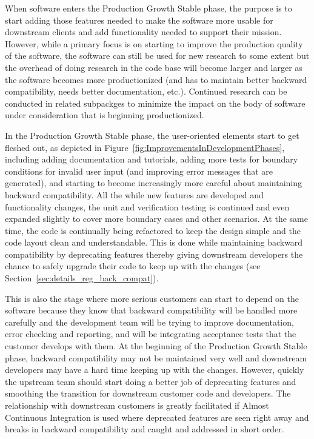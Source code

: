 \documentclass[11pt]{SANDreport}
\begin{document}
When software enters the Production Growth Stable phase, the purpose
is to start adding those features needed to make the software more
usable for downstream clients and add functionality needed to support
their mission.  However, while a primary focus is on starting to
improve the production quality of the software, the software can still
be used for new research to some extent but the overhead of doing
research in the code base will become larger and larger as the
software becomes more productionized (and has to maintain better
backward compatibility, needs better documentation, etc.).  Continued
research can be conducted in related subpackges to minimize the impact
on the body of software under consideration that is beginning
productionized.

In the Production Growth Stable phase, the user-oriented elements
start to get fleshed out, as depicted in
Figure~\ref{fig:ImprovementsInDevelopmentPhases}, including adding
documentation and tutorials, adding more tests for boundary conditions
for invalid user input (and improving error messages that are
generated), and starting to become increasingly more careful about
maintaining backward compatibility.  All the while new features are
developed and functionality changes, the unit and verification testing
is continued and even expanded slightly to cover more boundary cases
and other scenarios.  At the same time, the code is continually being
refactored to keep the design simple and the code layout clean and
understandable.  This is done while maintaining backward compatibility
by deprecating features thereby giving downstream developers the
chance to safely upgrade their code to keep up with the changes (see
Section~\ref{sec:details_reg_back_compat}).

This is also the stage where more serious customers can start to
depend on the software because they know that backward compatibility
will be handled more carefully and the development team will be trying
to improve documentation, error checking and reporting, and will be
integrating acceptance tests that the customer develops with them.  At
the beginning of the Production Growth Stable phase, backward
compatibility may not be maintained very well and downstream developers
may have a hard time keeping up with the changes.  However, quickly
the upstream team should start doing a better job of deprecating
features and smoothing the transition for downstream customer code and
developers.  The relationship with downstream customers is greatly
facilitated if Almost Continuous Integration
{}\cite{SoftwareIntegrationforCSE09} is used where deprecated features
are seen right away and breaks in backward compatibility and caught
and addressed in short order.
\end{document}
